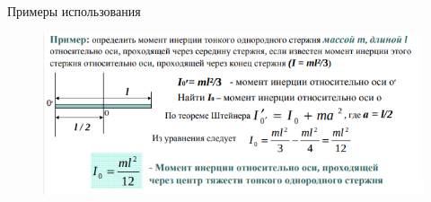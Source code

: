 \begin{example}
    Примеры использования
\end{example}
\begin{figure}[h]
    \centering
    \includegraphics[width=0.7\linewidth]{imgs/q10i1.png}
\end{figure}
